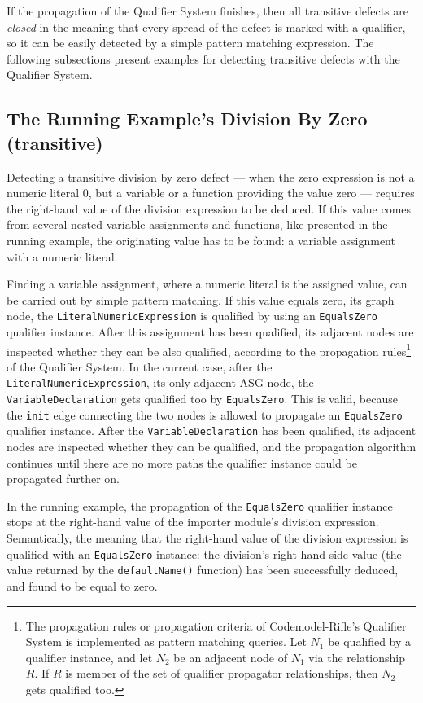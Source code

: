 If the propagation of the Qualifier System finishes, then all transitive defects are \emph{closed} in the meaning that every spread of the defect is marked with a qualifier, so it can be easily detected by a simple pattern matching expression. The following subsections present examples for detecting transitive defects with the Qualifier System.


\subsection{The Running Example's Division By Zero (transitive)}

Detecting a transitive division by zero defect — when the zero expression is not a numeric literal 0, but a variable or a function providing the value zero — requires the right-hand value of the division expression to be deduced. If this value comes from several nested variable assignments and functions, like presented in the running example, the originating value has to be found: a variable assignment with a numeric literal.

Finding a variable assignment, where a numeric literal is the assigned value, can be carried out by simple pattern matching. If this value equals zero, its graph node, the \lstinline{LiteralNumericExpression} is qualified by using an \lstinline{EqualsZero} qualifier instance. After this assignment has been qualified, its adjacent nodes are inspected whether they can be also qualified, according to the propagation rules\footnote{The propagation rules or propagation criteria of Codemodel-Rifle's Qualifier System is implemented as pattern matching queries. Let $N_1$ be qualified by a qualifier instance, and let $N_2$ be an adjacent node of $N_1$ via the relationship $R$. If $R$ is member of the set of qualifier propagator relationships, then $N_2$ gets qualified too.} of the Qualifier System. In the current case, after the \lstinline{LiteralNumericExpression}, its only adjacent ASG node, the \lstinline{VariableDeclaration} gets qualified too by \lstinline{EqualsZero}. This is valid, because the \lstinline{init} edge connecting the two nodes is allowed to propagate an \lstinline{EqualsZero} qualifier instance. After the \lstinline{VariableDeclaration} has been qualified, its adjacent nodes are inspected whether they can be qualified, and the propagation algorithm continues until there are no more paths the qualifier instance could be propagated further on.

In the running example, the propagation of the \lstinline{EqualsZero} qualifier instance stops at the right-hand value of the importer module's division expression. Semantically, the meaning that the right-hand value of the division expression is qualified with an \lstinline{EqualsZero} instance: the division's right-hand side value (the value returned by the \lstinline{defaultName()} function) has been successfully deduced, and found to be equal to zero.

